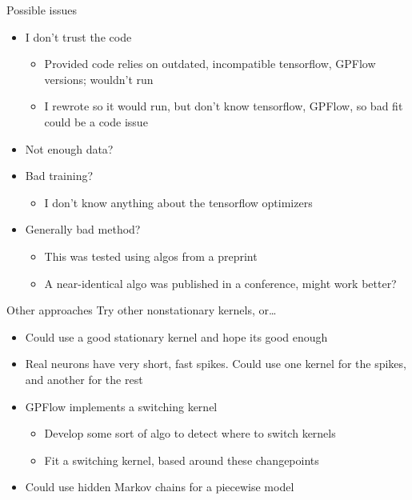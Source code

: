 \documentclass[presentation]{beamer}
\begin{document}
\begin{frame}[label={sec:orgf7176fb}]{Possible issues}
\begin{itemize}
\item I don't trust the code
\begin{itemize}
\item Provided code relies on outdated, incompatible tensorflow, GPFlow versions; wouldn't run
\item I rewrote so it would run, but don't know tensorflow, GPFlow, so bad fit could be a code issue
\end{itemize}
\item Not enough data?
\item Bad training?
\begin{itemize}
\item I don't know anything about the tensorflow optimizers
\end{itemize}
\item Generally bad method?
\begin{itemize}
\item This was tested using algos from a preprint
\item A near-identical algo was published in a conference, might work better?
\end{itemize}
\end{itemize}
\end{frame}

\begin{frame}[label={sec:org03061d9}]{Other approaches}
Try other nonstationary kernels, or\ldots{}
\vfill
\begin{itemize}
\item Could use a good stationary kernel and hope its good enough
\item Real neurons have very short, fast spikes. Could use one kernel for the spikes, and another for the rest
\item GPFlow implements a switching kernel
\begin{itemize}
\item Develop some sort of algo to detect where to switch kernels
\item Fit a switching kernel, based around these changepoints
\end{itemize}
\item Could use hidden Markov chains for a piecewise model
\end{itemize}
\end{frame}
\end{document}

